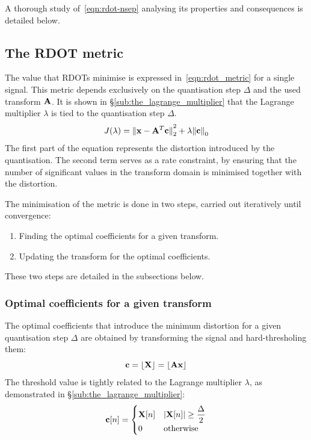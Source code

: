 \documentclass[11pt,a4paper,openright,twoside]{book}
\numberwithin{equation}{section} %
\numberwithin{figure}{section} %
\numberwithin{table}{section} %
\begin{document}
A thorough study of~\eqref{eqn:rdot-nsep} analysing its properties and
consequences is detailed below.

\subsection{The \acs{RDOT} metric}
\label{sub:the_rdot_metric}

The value that \acp{RDOT} minimise is expressed
in~\eqref{eqn:rdot_metric} for a single signal.
This metric depends exclusively on the quantisation step $\Delta$ and the
used transform $\mathbf{A}$.
It is shown in \S\ref{sub:the_lagrange_multiplier} that the Lagrange
multiplier $\lambda$ is tied to the quantisation step $\Delta$.
\begin{equation}
	J (\lambda) =
	{\Vert \mathbf{x} - \mathbf{A}^T \mathbf{c} \Vert}_2^2 + \lambda{\Vert \mathbf{c}\Vert}_0
	\label{eqn:rdot_metric}
\end{equation}
The first part of the equation represents the distortion introduced by
the quantisation.
The second term serves as a rate constraint, by ensuring that the number of
significant values in the transform domain is minimised together with the
distortion.

The minimisation of the metric is done in two steps, carried out iteratively
until convergence:
\begin{enumerate}
	\item Finding the optimal coefficients for a given transform.
	\item Updating the transform for the optimal coefficients.
\end{enumerate}

These two steps are detailed in the subsections below.
\subsubsection{Optimal coefficients for a given transform}
\label{ssub:optimal_coefficients_for_a_given_transform}

The optimal coefficients that introduce the minimum distortion for a given
quantisation step $\Delta$ are obtained by transforming the signal and
hard-thresholing them:
\begin{equation}
	\mathbf{c} = \lfloor \mathbf{X} \rfloor = \lfloor \mathbf{A} \mathbf{x} \rfloor
\end{equation}
The threshold value is tightly related to the Lagrange multiplier $\lambda$,
as demonstrated in \S\ref{sub:the_lagrange_multiplier}:
\begin{equation}
	\mathbf{c}[n] =
	\begin{cases}
		\mathbf{X}[n] & \vert \mathbf{X}[n] \vert \ge \displaystyle \frac{\Delta}{2} \\
		0     & \text{otherwise} \\
	\end{cases}
	\label{eqn:hard_threshold}
\end{equation}
\end{document}
